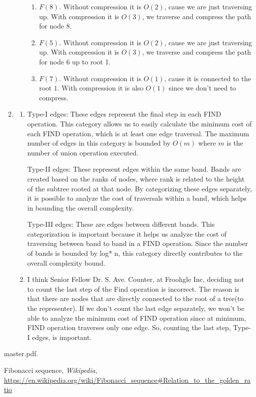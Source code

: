 \documentclass{article}
\begin{document}
\begin{enumerate}
\begin{enumerate}
\begin{enumerate}
      \item $F(8)$. Without compression it is $O(2)$, cause we are just traversing up.
      With compression it is $O(3)$, we traverse and compress the path for node 8.

      \item $F(5)$. Without compression it is $O(2)$, cause we are just traversing up.
      With compression it is $O(3)$, we traverse and compress the path for node 6 up to root 1.

      \item $F(7)$. Without compression it is $O(1)$, cause it is connected to the root $1$.
      With compression it is also $O(1)$ since we don't need to compress.
    \end{enumerate}
  \end{enumerate}
  \item
    \begin{enumerate}
      \item Type-I edges: These edges represent the final step in each FIND operation.
      This category allows us to easily calculate the minimum cost of each FIND operation, which is at least one edge traversal.
      The maximum number of edges in this category is bounded by $O(m)$ where $m$ is the number of union operation executed.\cite{master}

      Type-II edges: These represent edges within the same band.
      Bands are created based on the ranks of nodes, where rank is related to the height of the subtree rooted at that node.
      By categorizing these edges separately, it is possible to analyze the cost of traversals within a band, which helps in bounding the overall complexity.\cite{master}

      Type-III edges: These are edges between different bands.
      This categorization is important because it helps us analyze the cost of traversing between band to band in a FIND operation.
      Since the number of bands is bounded by log* n, this category directly contributes to the overall complexity bound.\cite{master}

      \item I think Senior Fellow Dr. S. Ave. Counter, at Froohgle Inc, deciding not to count the last step of the Find operation is incorrect.
      The reason is that there are nodes that are directly connected to the root of a tree(to the representer).
      If we don't count the last edge separately, we won't be able to analyze the minimum cost of FIND operation since at minimum, FIND operation traverses only one edge.
      So, counting the last step, Type-I edges, is important.
  \end{enumerate}
\end{enumerate}

\begin{thebibliography}{9}

master.pdf.

Fibonacci sequence, \emph{Wikipedia}, \url{https://en.wikipedia.org/wiki/Fibonacci_sequence#Relation_to_the_golden_ratio}

\end{thebibliography}
\end{document}
